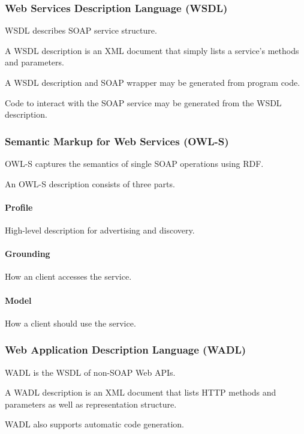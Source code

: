 \documentclass{report}
\begin{document}
\subsubsection{Web Services Description Language (WSDL)}

WSDL describes SOAP service structure.

A WSDL description is an XML document
that simply lists a service's methods and parameters.

A WSDL description and SOAP wrapper may
be generated from program code.

Code to interact with the SOAP service may
be generated from the WSDL description.

\subsubsection{Semantic Markup for Web Services (OWL-S)}

OWL-S captures the semantics
of single SOAP operations using RDF.

An OWL-S description consists of three parts.

\paragraph{Profile}

High-level description for advertising and discovery.

\paragraph{Grounding}

How an client accesses the service.

\paragraph{Model}

How a client should use the service.

\subsubsection{Web Application Description Language (WADL)}

WADL is the WSDL of non-SOAP Web APIs.

A WADL description is an XML document
that lists HTTP methods and parameters
as well as representation structure.

WADL also supports automatic code generation.
\end{document}
